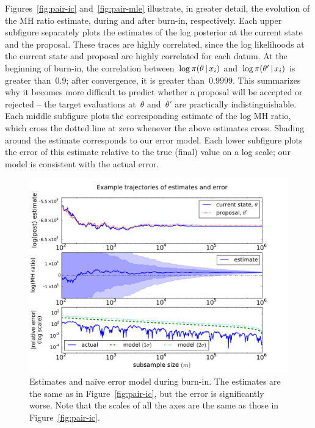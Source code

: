 \documentclass[angelino.tex]{subfiles}
\begin{document}
Figures~\ref{fig:pair-ic} and~\ref{fig:pair-mle} illustrate, in greater detail,
the evolution of the MH ratio estimate, during and after burn-in, respectively.
%
Each upper subfigure separately plots the estimates of the log posterior at the
current state and the proposal.
These traces are highly correlated, since the log likelihoods at the current
state and proposal are highly correlated for each datum.
At the beginning of burn-in, the correlation between~$\log \pi(\theta \,|\, x_i)$
and~$\log \pi(\theta' \,|\, x_i)$ is greater than~${0.9}$;
after convergence, it is greater than~${0.9999}$.
This summarizes why it becomes more difficult to predict whether a proposal will
be accepted or rejected -- the target evaluations at~$\theta$ and~$\theta'$ are
practically indistinguishable.
%
Each middle subfigure plots the corresponding estimate of the log MH ratio,
which cross the dotted line at zero whenever the above estimates cross.
Shading around the estimate corresponds to our error model.
%
Each lower subfigure plots the error of this estimate relative to the true (final)
value on a log scale; our model is consistent with the actual error.

\begin{figure}[t!]
\begin{center}
\includegraphics[width=\textwidth]{figs/eddie/mix-ic-traces-pair.pdf}
\end{center}
\caption{Estimates and na\"ive error model during burn-in.
The estimates are the same as in Figure~\ref{fig:pair-ic},
but the error is significantly worse.
Note that the scales of all the axes are the same as those in Figure~\ref{fig:pair-ic}.}
\label{fig:naive-error}
\end{figure} 
\end{document}
